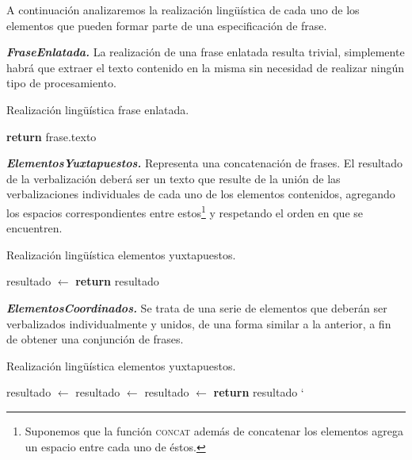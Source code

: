 A continuación analizaremos la realización lingüística de cada uno de los elementos que pueden formar parte de una especificación de frase.

\medskip
\noindent
\textbf{\emph{FraseEnlatada.}} La realización de una frase enlatada resulta trivial, simplemente habrá que extraer el texto contenido en la misma sin necesidad de realizar ningún tipo de procesamiento.

\begin{algorithm}[H]
\caption{Realización lingüística frase enlatada.}
\begin{algorithmic}[1]
\State \textbf{return} frase.texto
\EndFunction
\end{algorithmic}
\end{algorithm}


\medskip
\noindent
\textbf{\emph{ElementosYuxtapuestos.}} Representa una concatenación de frases. El resultado de la verbalización deberá ser un texto que resulte de la unión de las verbalizaciones individuales de cada uno de los elementos contenidos, agregando los espacios correspondientes entre estos\footnote{Suponemos que la función \textsc{concat} además de concatenar los elementos agrega un espacio entre cada uno de éstos.} y respetando el orden en que se encuentren. 

\begin{algorithm}[H]
\caption{Realización lingüística elementos yuxtapuestos.} 
\begin{algorithmic}[1]
\State resultado $\gets$ 
\EndFor
\State \textbf{return} resultado
\EndFunction
\end{algorithmic}
\end{algorithm}

\medskip
\noindent
\textbf{\emph{ElementosCoordinados.}} Se trata de una serie de elementos que deberán ser verbalizados individualmente y unidos, de una forma similar a la anterior, a fin de obtener una conjunción de frases.

\begin{algorithm}[H]
\caption{Realización lingüística elementos yuxtapuestos.}
\begin{algorithmic}[1]
\State resultado $\gets$ 
\State resultado $\gets$ 
\Else
\State resultado $\gets$ 
\EndIf
\EndFor
\State \textbf{return} resultado
\EndFunction`
\end{algorithmic}
\end{algorithm}

